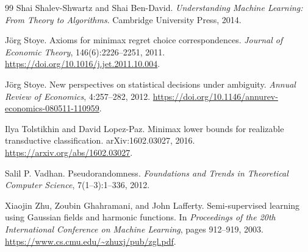 \documentclass[11pt,twoside]{article}
\theoremstyle{definition}
\theoremstyle{remark}
\begin{document}
\begin{thebibliography}{99}
Shai Shalev-Shwartz and Shai Ben-David.
\newblock \emph{Understanding Machine Learning: From Theory to Algorithms}.
\newblock Cambridge University Press, 2014.

J\"org Stoye.
\newblock Axioms for minimax regret choice correspondences.
\newblock \emph{Journal of Economic Theory}, 146(6):2226--2251, 2011.
\newblock \url{https://doi.org/10.1016/j.jet.2011.10.004}.

J\"org Stoye.
\newblock New perspectives on statistical decisions under ambiguity.
\newblock \emph{Annual Review of Economics}, 4:257--282, 2012.
\newblock \url{https://doi.org/10.1146/annurev-economics-080511-110959}.

Ilya Tolstikhin and David Lopez-Paz.
\newblock Minimax lower bounds for realizable transductive classification.
\newblock arXiv:1602.03027, 2016.
\newblock \url{https://arxiv.org/abs/1602.03027}.

Salil P. Vadhan.
\newblock Pseudorandomness.
\newblock \emph{Foundations and Trends in Theoretical Computer Science},
7(1--3):1--336, 2012.

Xiaojin Zhu, Zoubin Ghahramani, and John Lafferty.
\newblock Semi-supervised learning using Gaussian fields and harmonic
functions.
\newblock In \emph{Proceedings of the 20th International Conference on
Machine Learning}, pages 912--919, 2003.
\newblock \url{https://www.cs.cmu.edu/~zhuxj/pub/zgl.pdf}.

\end{thebibliography}
\end{document}
